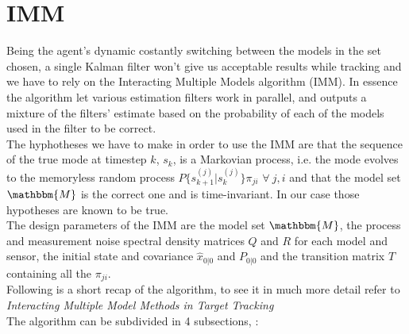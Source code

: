 \documentclass[twocolumn]{article}
\begin{document}
\section*{IMM}
Being the agent's dynamic costantly switching between the models in the set chosen, a single Kalman filter won't give us acceptable results while
tracking and we have to rely on the Interacting Multiple Models algorithm (IMM). In essence the algorithm let various estimation filters work in parallel, and outputs a mixture of the filters' estimate based on the probability of each of the models used in the filter to be correct.
\\
The hyphotheses we have to make in order to use the IMM are that the sequence of the true mode at timestep $k$, $s_{k}$, is a Markovian process, i.e. the mode evolves to the
memoryless random process $P\{s_{k+1}^{(j)}|s_{k}^{(j)}\}\pi_{ji}$ $\forall\ j,i$ and that the model set $\mathbbm{M}$ is the correct one and is time-invariant.
In our case those hypotheses are known to be true.
\\
The design parameters of the IMM are the model set $\mathbbm{M}$, the process and measurement noise spectral density
matrices $Q$ and $R$ for each model and sensor, the initial state and covariance $\hat{x}_{0|0}$ and $P_{0|0}$
and the transition matrix $T$ containing all the $\pi_{ji}$.
\\
Following is a short recap of the algorithm, to see it in much more detail refer to \textit{Interacting Multiple Model Methods in Target Tracking}  \cite{bar-shalomInteractingMultipleModel}
\\
The algorithm can be subdivided in 4 subsections, :
\end{document}
